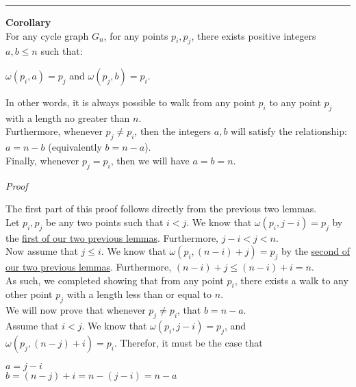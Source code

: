\documentclass[a4paper,12pt]{article}
\begin{document}
\begin{center}
\noindent\rule{8cm}{0.4pt}
\end{center}



\label{corollary:inverse_omega_relationship}
\hypertarget{corollary:inverse_omega_relationship}{}
\begin{tcolorbox}
\textbf{Corollary}\\
For any cycle graph $G_n$, for any points $p_i, p_j$, there exists positive integers $a, b \leq n$ such that:
\begin{center}
$\omega(p_i, a) = p_j$ and
$\omega(p_j, b) = p_i$.
\end{center}

\noindent In other words, it is always possible to walk from any point $p_i$ to any point $p_j$ with a length no greater than $n$.\\

\noindent Furthermore, whenever $p_j \neq p_i$, then the integers $a, b$ will satisfy the relationship: $a = n - b$ (equivalently $b = n - a$).\\

\noindent Finally, whenever $p_j = p_i$, then we will have $a = b = n$.
\end{tcolorbox}


\noindent
\textit{Proof}

\noindent The first part of this proof follows directly from the previous two lemmas.\\

\noindent Let $p_i, p_j$ be any two points such that $i < j$. We know that $\omega(p_i, j - i) = p_j$ by the \hyperlink{lemma:existence_of_walk_1}{first of our two previous lemmas}. Furthermore, $j - i < j < n$.\\

\noindent Now assume that $j \leq i$. We know that $\omega(p_i, (n - i) + j) = p_j$ by the \hyperlink{lemma:existence_of_walk_2}{second of our two previous lemmas}. Furthermore, $(n - i) + j \leq (n - i) + i = n$.\\

\noindent As such, we completed showing that from any point $p_i$, there exists a walk to any other point $p_j$ with a length less than or equal to $n$.\\

\noindent We will now prove that whenever $p_j \neq p_i$, that $b = n - a$.\\

\noindent Assume that $i < j$. We know that $\omega(p_i, j - i) = p_j$, and $\omega(p_j, (n - j) + i) = p_i$. Therefor, it must be the case that
\begin{center}
$a = j - i$\\
$b = (n - j) + i = n - (j - i) = n - a$
\end{center}
\end{document}
